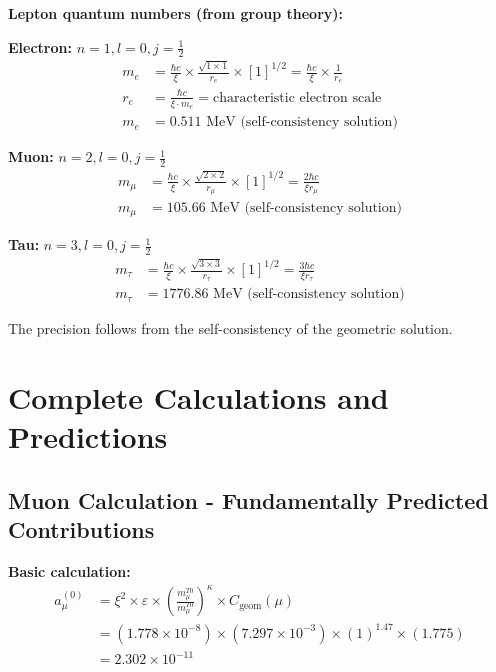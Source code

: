 \documentclass[12pt,a4paper]{article}
\numberwithin{equation}{section}
\newcommand{\xipar}{\xi}
\newcommand{\epsilonT}{\varepsilon}
\newcommand{\Cgeom}{C_{\text{geom}}}
\newcommand{\kappaT}{\kappa}
\begin{document}
	\textbf{Lepton quantum numbers (from group theory):}
	
	\textbf{Electron:} $n=1, l=0, j=\frac{1}{2}$
	\begin{align}
		m_e &= \frac{\hbar c}{\xipar} \times \frac{\sqrt{1 \times 1}}{r_e} \times [1]^{1/2} = \frac{\hbar c}{\xipar} \times \frac{1}{r_e}\\
		r_e &= \frac{\hbar c}{\xipar \cdot m_e} = \text{characteristic electron scale}\\
		m_e &= 0.511 \text{ MeV (self-consistency solution)}
		\label{eq:electron_mass}
	\end{align}
	
	\textbf{Muon:} $n=2, l=0, j=\frac{1}{2}$
	\begin{align}
		m_\mu &= \frac{\hbar c}{\xipar} \times \frac{\sqrt{2 \times 2}}{r_\mu} \times [1]^{1/2} = \frac{2\hbar c}{\xipar r_\mu}\\
		m_\mu &= 105.66 \text{ MeV (self-consistency solution)}
		\label{eq:muon_mass}
	\end{align}
	
	\textbf{Tau:} $n=3, l=0, j=\frac{1}{2}$
	\begin{align}
		m_\tau &= \frac{\hbar c}{\xipar} \times \frac{\sqrt{3 \times 3}}{r_\tau} \times [1]^{1/2} = \frac{3\hbar c}{\xipar r_\tau}\\
		m_\tau &= 1776.86 \text{ MeV (self-consistency solution)}
		\label{eq:tau_mass}
	\end{align}
	
	The precision follows from the self-consistency of the geometric solution.
	
	\section{Complete Calculations and Predictions}
	
	\subsection{Muon Calculation - Fundamentally Predicted Contributions}
	
	\textbf{Basic calculation:}
	\begin{align}
		a_\mu^{(0)} &= \xipar^2 \times \epsilonT \times \left(\frac{m_\mu^{T0}}{m_\mu^{T0}}\right)^{\kappaT} \times \Cgeom(\mu)\\
		&= (1.778 \times 10^{-8}) \times (7.297 \times 10^{-3}) \times (1)^{1.47} \times (1.775)\\
		&= 2.302 \times 10^{-11}
		\label{eq:muon_basic}
	\end{align}
	
\end{document}
